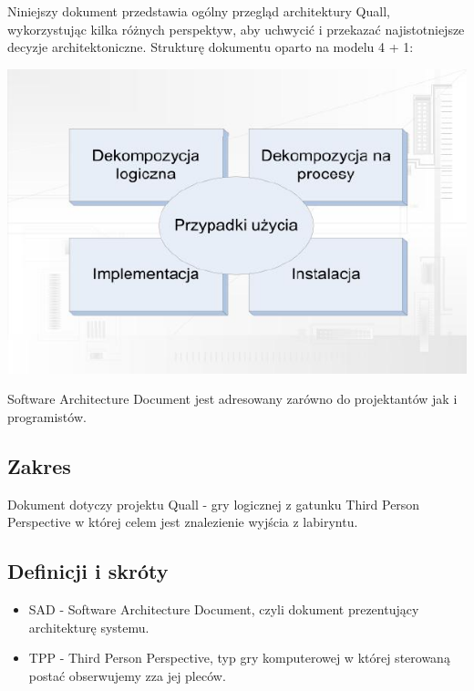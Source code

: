 \documentclass[12pt,a4paper,twoside]{article}
\begin{document}
Niniejszy dokument przedstawia ogólny przegląd architektury Quall, wykorzystując kilka różnych perspektyw, aby uchwycić i przekazać najistotniejsze decyzje architektoniczne. Strukturę dokumentu oparto na modelu 4 + 1:

\includegraphics{pics/struktura.jpg}

Software Architecture Document jest adresowany zarówno do projektantów jak i programistów.

\subsection{Zakres}


Dokument dotyczy projektu Quall - gry logicznej z gatunku Third Person Perspective w której celem jest znalezienie wyjścia z labiryntu.

\subsection{Definicji i skróty}


\begin{itemize}
\item SAD - Software Architecture Document, czyli dokument prezentujący architekturę systemu.
\item TPP - Third Person Perspective, typ gry komputerowej w której sterowaną postać obserwujemy zza jej pleców.
\end{itemize}
\end{document}

